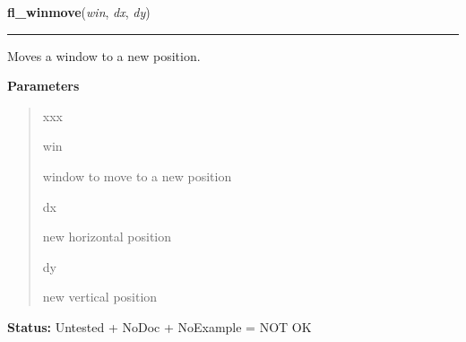 \hspace{.8\funcindent}\begin{boxedminipage}{\funcwidth}

    \raggedright \textbf{fl\_winmove}(\textit{win}, \textit{dx}, \textit{dy})

    \vspace{-1.5ex}

    \rule{\textwidth}{0.5\fboxrule}
\setlength{\parskip}{2ex}
    Moves a window to a new position.

\setlength{\parskip}{1ex}
      \textbf{Parameters}
      \vspace{-1ex}

      \begin{quote}
        \begin{Ventry}{xxx}

          \item[win]

          window to move to a new position

          \item[dx]

          new horizontal position

          \item[dy]

          new vertical position

        \end{Ventry}

      \end{quote}

\textbf{Status:} Untested + NoDoc + NoExample = NOT OK



    \end{boxedminipage}

    \label{xformslib:library:fl_winreshape}

    \vspace{0.5ex}

